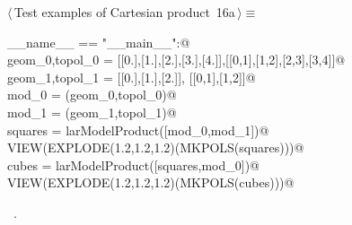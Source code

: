 \documentclass[11pt,oneside]{article}	%
\begin{document}
\begin{flushleft} \small
\begin{minipage}{\linewidth} \label{scrap23}
\protect{}$\langle\,$Test examples of Cartesian product\nobreak\ {\footnotesize 16a}$\,\rangle\equiv$
\vspace{-1ex}
\begin{list}{}{} \item
\mbox{}\verb@if __name__ == "__main__":@\\
\mbox{}\verb@    geom_0,topol_0 = [[0.],[1.],[2.],[3.],[4.]],[[0,1],[1,2],[2,3],[3,4]]@\\
\mbox{}\verb@    geom_1,topol_1 = [[0.],[1.],[2.]], [[0,1],[1,2]]@\\
\mbox{}\verb@    mod_0 = (geom_0,topol_0)@\\
\mbox{}\verb@    mod_1 = (geom_1,topol_1)@\\
\mbox{}\verb@    squares = larModelProduct([mod_0,mod_1])@\\
\mbox{}\verb@    VIEW(EXPLODE(1.2,1.2,1.2)(MKPOLS(squares)))@\\
\mbox{}\verb@    cubes = larModelProduct([squares,mod_0])@\\
\mbox{}\verb@    VIEW(EXPLODE(1.2,1.2,1.2)(MKPOLS(cubes)))@\\
\mbox{}\verb@@{\NWsep}
\end{list}
\vspace{-1ex}
\footnotesize\addtolength{\baselineskip}{-1ex}
\begin{list}{}{\setlength{\itemsep}{-\parsep}\setlength{\itemindent}{-\leftmargin}}
\item \NWtxtMacroRefIn\ .
\end{list}
\end{minipage}\\[4ex]
\end{flushleft}
\end{document}
